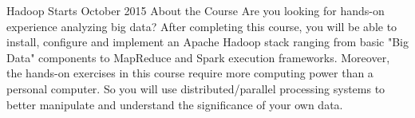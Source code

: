 Hadoop
Starts October 2015
About the Course
Are you looking for hands-on experience analyzing big data?   After completing this course, you will be able to install, configure and implement an Apache Hadoop stack ranging from basic "Big Data" components to MapReduce and Spark execution frameworks. Moreover, the hands-on exercises in this course require more computing power than a personal computer. So you will use  distributed/parallel processing systems to better manipulate and understand the significance of your own data.

